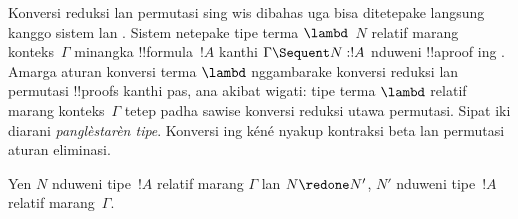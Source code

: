 \documentclass[../../../include/open-logic-section]{subfiles}
\begin{document}


Konversi reduksi lan permutasi sing wis dibahas uga bisa ditetepake
langsung kanggo sistem  lan . Sistem 
netepake tipe terma $\lambd$~$N$ relatif marang konteks~$\Gamma$
minangka !!{formula}~$!A$ kanthi $\Gamma \Sequent N : !A$ nduweni
!!a{proof} ing . Amarga aturan konversi terma $\lambd$
nggambarake konversi reduksi lan permutasi !!{proof}s kanthi pas,
ana akibat wigati: tipe terma $\lambd$ relatif marang konteks~$\Gamma$
tetep padha sawise konversi reduksi utawa permutasi. Sipat iki diarani
\emph{panglèstarèn tipe}. Konversi ing kéné nyakup kontraksi beta lan permutasi aturan eliminasi.

\begin{prop}
Yen $N$ nduweni tipe~$!A$ relatif marang $\Gamma$ lan $N \redone N'$,
$N'$ nduweni tipe~$!A$ relatif marang~$\Gamma$.
\end{prop}
\end{document}
